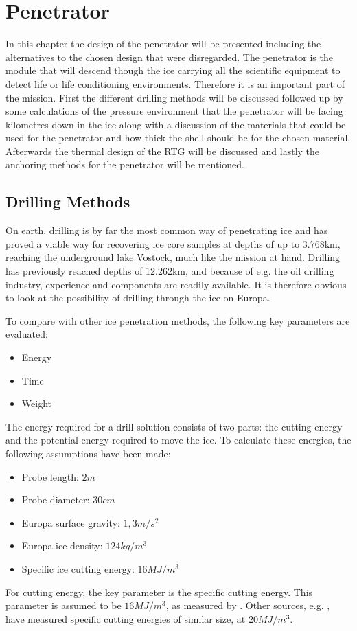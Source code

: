 \chapter{Penetrator}
In this chapter the design of the penetrator will be presented including the alternatives to the chosen design that were disregarded. The penetrator is the module that will descend though the ice carrying all the scientific equipment to detect life or life conditioning environments. Therefore it is an important part of the mission. First the different drilling methods will be discussed followed up by some calculations of the pressure environment that the penetrator will be facing kilometres down in the ice along with a discussion of the materials that could be used for the penetrator and how thick the shell should be for the chosen material. Afterwards the thermal design of the RTG will be discussed and lastly the anchoring methods for the penetrator will be mentioned. 

\section{Drilling Methods}

On earth, drilling is by far the most common way of penetrating ice and has proved a viable way for recovering ice core samples at depths of up to 3.768km, reaching the underground lake Vostock, much like the mission at hand. Drilling has previously reached depths of 12.262km, and because of e.g. the oil drilling industry, experience and components are readily available. It is therefore obvious to look at the possibility of drilling through the ice on Europa.

To compare with other ice penetration methods, the following key parameters are evaluated:
\begin{itemize}
    \item Energy
	\item Time
	\item Weight
\end{itemize}
The energy required for a drill solution consists of two parts: the cutting energy and the potential energy required to move the ice. To calculate these energies, the following assumptions have been made:
\begin{itemize}
	\item Probe length:   $2m$
	\item Probe diameter:   $30cm$
	\item Europa surface gravity:   $1,3m/s^2$
	\item Europa ice density:   $124kg/m^3$
	\item Specific ice cutting energy:   $16MJ/m^3$
\end{itemize}
For cutting energy, the key parameter is the specific cutting energy. This parameter is assumed to be $16MJ/m^3$, as measured by \cite{icecore}. Other sources, e.g. \cite{extremeenvironments}, have measured specific cutting energies of similar size, at $20MJ/m^3$.

